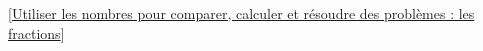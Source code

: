 [\href{https://cache.media.education.gouv.fr/file/Fractions/23/2/RA16_C4_MATH_fractions_flash3_sens_quotient_554232.pdf}
{Utiliser les nombres pour comparer, calculer et résoudre des problèmes : les fractions}]